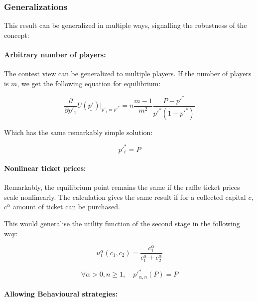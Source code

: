 \documentclass{article}
\theoremstyle{definition}
\begin{document}
\subsubsection{Generalizations}

This result can be generalized in multiple ways, signalling the robustness of the concept:

\paragraph{Arbitrary number of players:}

The contest view can be generalized to multiple players. If the number of players is $m$, we get the following equation for equilibrium:

\begin{equation}
    \frac{\partial}{\partial p'_1} U(\underline{p'}) \Bigr|_{p'_i = p'^*}  = n \frac{m-1}{m^2} \frac{P-p'^*}{p'^* (1-p'^*)}
\end{equation}

Which has the same remarkably simple solution:

\begin{equation}
    p'^*_i = P
\end{equation}

\paragraph{Nonlinear ticket prices:}

Remarkably, the equilibrium point remains the same if the raffle ticket prices scale nonlinearly.
The calculation gives the same result if for a collected capital $c$, $c^\alpha$ amount of ticket can be purchased.

This would generalise the utility function of the second stage in the following way:

    \begin{equation}
        u_1^\alpha(c_1,c_2) = \frac{c_1^\alpha}{c_1^\alpha+c_2^\alpha}
    \end{equation}

    \begin{equation}
    \forall \alpha > 0, n \ge 1, \quad p'^*_{\alpha,n}(P) = P
    \end{equation}

\paragraph{Allowing Behavioural strategies:}
\end{document}
